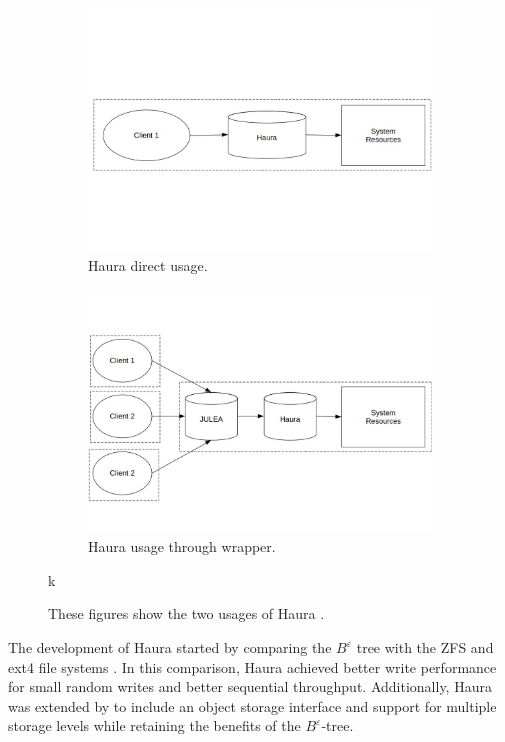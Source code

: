 \documentclass[
	12pt,
	a4paper,
	abstract,
	bibliography=totoc,
	chapterprefix,
	headings=openright,
	numbers=endperiod,
	parskip=half,
	twoside,
]{scrreprt}
\begin{document}
\begin{figure}[H]
	\centering
	\begin{subfigure}{0.4\textwidth}
		\includegraphics[width=\textwidth]{haura_directly.jpg}		
		\caption{Haura direct usage.}
		\label{fig:randread zipf}
	\end{subfigure}
	\hfill
	\begin{subfigure}{0.4\textwidth}
		\includegraphics[width=\textwidth]{haura_wrapper.jpg}		
		\caption{Haura usage through wrapper.}
		\label{fig:randread normal}
	\end{subfigure}k
	
	\caption{These figures show the two usages of Haura \cite{hauraDocu}.}
	\label{fig:haura usage}
\end{figure}

The development of Haura started by comparing the $B^{\varepsilon}$ tree with the ZFS 
and ext4 file systems \cite{wiedemann2018modern}.
In this comparison, Haura achieved better write performance for small random writes and better sequential throughput.
Additionally, Haura was extended by \cite{hoppner2021design} to include an object storage interface and 
support for multiple storage levels while retaining the benefits of the $B^{\varepsilon}$-tree.
\end{document}
